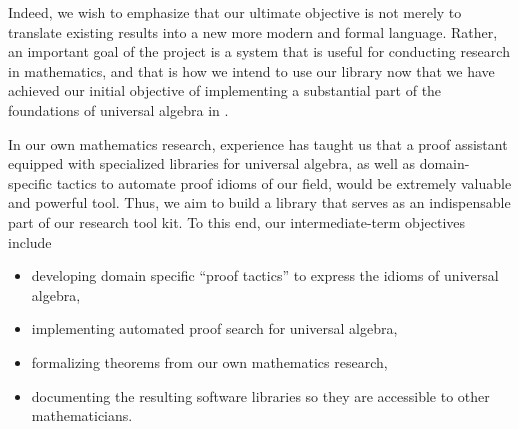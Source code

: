 Indeed, we wish to emphasize that our ultimate objective is not merely to translate existing results into a new more modern and formal language. Rather, an important goal of the \ualib project is a system that is useful for conducting research in mathematics, and that is how we intend to use our library now that we have achieved our initial objective of implementing a substantial part of the foundations of universal algebra in \agda.

In our own mathematics research, experience has taught us that a proof assistant equipped with specialized libraries for universal algebra, as well as domain-specific tactics to automate proof idioms of our field, would be extremely valuable and powerful tool. Thus, we aim to build a library that serves as an indispensable part of our research tool kit. To this end, our intermediate-term objectives include
\begin{itemize}
\item developing domain specific ``proof tactics'' to express the idioms of universal algebra,
\item implementing automated proof search for universal algebra,
\item formalizing theorems from our own mathematics research,
\item documenting the resulting software libraries so they are accessible to other mathematicians.
\end{itemize}


